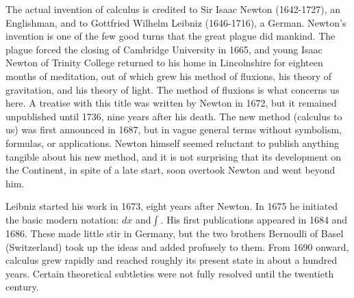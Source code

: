 \documentclass[titlepage,a4paper,12pt]{report}
\begin{document}
\noindent The actual invention of calculus is credited to Sir Isaac Newton (1642-1727),
an Englishman, and to Gottfried Wilhelm Leibniz (1646-1716), a German. Newton's
invention is one of the few good turns that the great plague did mankind. The plague
forced the closing of Cambridge University in 1665, and young Isaac Newton of Trinity
College returned to his home in Lincolnshire for eighteen months of meditation, out
of which grew his method of fluxions, his theory of gravitation, and his theory of light.
The method of fluxions is what concerns us here. A treatise with this title was written
by Newton in 1672, but it remained unpublished until 1736, nine years after his death.
The new method (calculus to us) was first announced in 1687, but in vague general
terms without symbolism, formulas, or applications. Newton himself seemed reluctant
to publish anything tangible about his new method, and it is not surprising that its
development on the Continent, in spite of a late start, soon overtook Newton and went
beyond him.

\noindent Leibniz started his work in 1673, eight years after Newton. In 1675 he initiated the
basic modern notation: $dx$ and$\int$. His first publications appeared in 1684 and 1686. These
made little stir in Germany, but the two brothers Bernoulli of Basel (Switzerland) took
up the ideas and added profusely to them. From 1690 onward, calculus grew rapidly and
reached roughly its present state in about a hundred years. Certain theoretical subtleties
were not fully resolved until the twentieth century.
\end{document}
